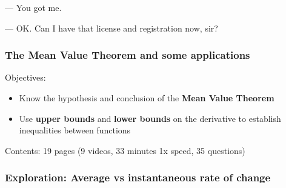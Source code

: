 \documentclass[pdftex, brazil, 12pt, twoside]{article}
\begin{document}
\begin{figure}[H]
  \begin{center}
    \label{fig:mvt-motiv}
  \end{center}
\end{figure}

--- You got me.

--- OK. Can I have that license and registration now, sir?

\subsubsection{The Mean Value Theorem and some applications}
\label{u1-mvt-applications}

Objectives:

\begin{itemize}[noitemsep]
\item Know the hypothesis and conclusion of the \textbf{Mean Value Theorem}
\item Use \textbf{upper bounds} and \textbf{lower bounds} on the derivative
  to establish inequalities between functions
\end{itemize}

Contents: 19 pages (9 videos, 33 minutes 1x speed, 35 questions)

\subsubsection{Exploration: Average vs instantaneous rate of change}
\label{u1-mvt-avgxinst}
\end{document}
